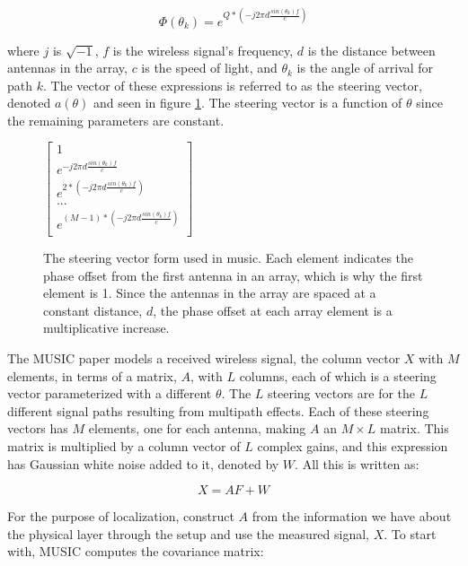 \documentclass[12pt]{report}
\begin{document}
$$\Phi(\theta_{k}) = e^{Q * (-j 2 \pi d \frac{sin(\theta_{k}) f}{c})}$$

where $j$ is $\sqrt{-1}$, $f$ is the wireless signal's frequency, $d$ is the distance between antennas in the array, $c$ is the speed of light, and $\theta_k$ is the angle of arrival for path $k$. The vector of these expressions is referred to as the steering vector, denoted $a(\theta)$ and seen in figure \ref{figure: music-steering-vector}. The steering vector is a function of $\theta$ since the remaining parameters are constant. \par

\begin{figure}[!htb]
    \begin{center}
        \caption{The steering vector form used in music. Each element indicates the phase offset from the first antenna in an array, which is why the first element is 1. Since the antennas in the array are spaced at a constant distance, $d$, the phase offset at each array element is a multiplicative increase.}
        \label{figure: music-steering-vector}
        $\begin{bmatrix}
        1 \\
        e^{-j 2 \pi d \frac{sin(\theta_{k}) f}{c}} \\
        e^{2 * (-j 2 \pi d \frac{sin(\theta_{k}) f}{c})} \\
        ... \\
        e^{(M - 1) * (-j 2 \pi d \frac{sin(\theta_{k}) f}{c})} \\
        \end{bmatrix}$
    \end{center}
\end{figure}

The MUSIC paper models a received wireless signal, the column vector $X$ with $M$ elements, in terms of a matrix, $A$, with $L$ columns, each of which is a steering vector parameterized with a different $\theta$. The $L$ steering vectors are for the $L$ different signal paths resulting from multipath effects. Each of these steering vectors has $M$ elements, one for each antenna, making $A$ an $M \times L$ matrix. This matrix is multiplied by a column vector of $L$ complex gains, and this expression has Gaussian white noise added to it, denoted by $W$. All this is written as:

$$X = AF + W$$

For the purpose of localization, construct $A$ from the information we have about the physical layer through the setup and use the measured signal, $X$. To start with, MUSIC computes the covariance matrix:
\end{document}
